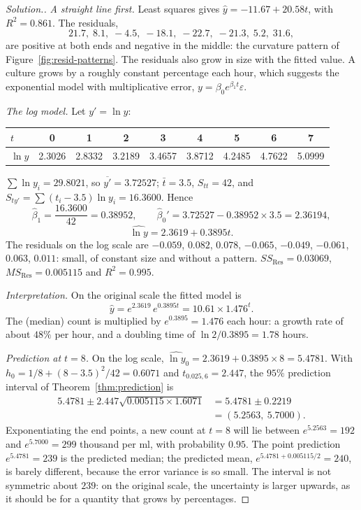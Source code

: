 \documentclass[11pt,a4paper]{article}
\numberwithin{equation}{section}
\theoremstyle{definition}
\newenvironment{solution}
  {\renewcommand{\qedsymbol}{}\begin{proof}[\textit{Solution}.]}
  {\end{proof}}
\begin{document}
\begin{solution}
\emph{A straight line first.} Least squares gives $\hat y = -11.67 + 20.58t$, with $R^2 = 0.861$. The
residuals,
\[
21.7,\; 8.1,\; -4.5,\; -18.1,\; -22.7,\; -21.3,\; 5.2,\; 31.6 ,
\]
are positive at both ends and negative in the middle: the curvature pattern of
Figure~\ref{fig:resid-patterns}. The residuals also grow in size with the fitted value. A
culture grows by a roughly constant percentage each hour, which suggests the exponential model
with multiplicative error, $y = \beta_0 e^{\beta_1 t}\varepsilon$.

\emph{The log model.} Let $y' = \ln y$:
\begin{center}
\begin{tabular}{l|cccccccc}
$t$ & 0 & 1 & 2 & 3 & 4 & 5 & 6 & 7 \\
\hline
$\ln y$ & 2.3026 & 2.8332 & 3.2189 & 3.4657 & 3.8712 & 4.2485 & 4.7622 & 5.0999 \\
\end{tabular}
\end{center}
$\sum \ln y_i = 29.8021$, so $\overline{y'} = 3.72527$; $\bar t = 3.5$, $S_{tt} = 42$, and
$S_{ty'} = \sum(t_i - 3.5)\ln y_i = 16.3600$. Hence
\[
\hat\beta_1 = \frac{16.3600}{42} = 0.38952, \qquad
\hat\beta_0' = 3.72527 - 0.38952 \times 3.5 = 2.36194 ,
\]
\[
\widehat{\ln y} = 2.3619 + 0.3895t .
\]
The residuals on the log scale are
$-0.059$, $0.082$, $0.078$, $-0.065$, $-0.049$, $-0.061$, $0.063$, $0.011$: small, of constant size and
without a pattern. $SS_{\mathrm{Res}} = 0.03069$, $MS_{\mathrm{Res}} = 0.005115$ and $R^2 = 0.995$.

\emph{Interpretation.} On the original scale the fitted model is
\[
\hat y = e^{2.3619}\,e^{0.3895t} = 10.61 \times 1.476^t .
\]
The (median) count is multiplied by $e^{0.3895} = 1.476$ each hour: a growth rate of about
$48\%$ per hour, and a doubling time of $\ln 2/0.3895 = 1.78$ hours.

\emph{Prediction at $t = 8$.} On the log scale, $\widehat{\ln y}_0 = 2.3619 + 0.3895 \times 8 = 5.4781$.
With $h_0 = 1/8 + (8 - 3.5)^2/42 = 0.6071$ and $t_{0.025,6} = 2.447$, the $95\%$ prediction
interval of Theorem~\ref{thm:prediction} is
\begin{align*}
5.4781 \pm 2.447\sqrt{0.005115 \times 1.6071} &= 5.4781 \pm 0.2219 \\
&= (5.2563,\ 5.7000) .
\end{align*}
Exponentiating the end points, a new count at $t = 8$ will lie between $e^{5.2563} = 192$ and
$e^{5.7000} = 299$ thousand per ml, with probability $0.95$. The point prediction
$e^{5.4781} = 239$ is the predicted median; the predicted mean,
$e^{5.4781 + 0.005115/2} = 240$, is barely different, because the error variance is so small.
The interval is not symmetric about $239$: on the original scale, the uncertainty is larger
upwards, as it should be for a quantity that grows by percentages.
\end{solution}
\end{document}
